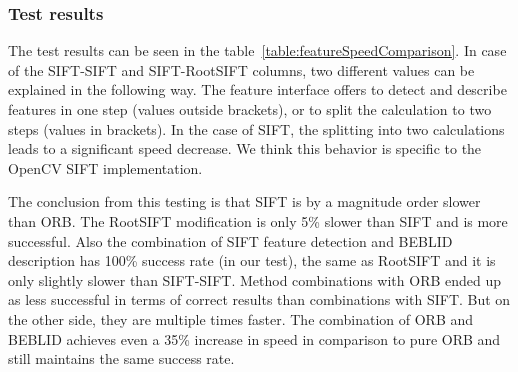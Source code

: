 \documentclass[thesis=B,english]{FITthesis}[2019/12/23]
\begin{document}
                \subsubsection*{Test results}
                The test results can be seen in the table~\ref{table:featureSpeedComparison}. In case of the SIFT-SIFT and SIFT-RootSIFT columns, two different values can be explained in the following way. The feature interface offers to detect and describe features in one step (values outside brackets), or to split the calculation to two steps (values in brackets). In the case of SIFT, the splitting into two calculations leads to a significant speed decrease. We think this behavior is specific to the OpenCV SIFT implementation.
                
                The conclusion from this testing is that SIFT is by a magnitude order slower than ORB. The RootSIFT modification is only 5\% slower than SIFT and is more successful. Also the combination of SIFT feature detection and BEBLID description has 100\% success rate (in our test), the same as RootSIFT and it is only slightly slower than SIFT-SIFT. Method combinations with ORB ended up as less successful in terms of correct results than combinations with SIFT. But on the other side, they are multiple times faster. The combination of ORB and BEBLID achieves even a 35\% increase in speed in comparison to pure ORB and still maintains the same success rate.
\end{document}
